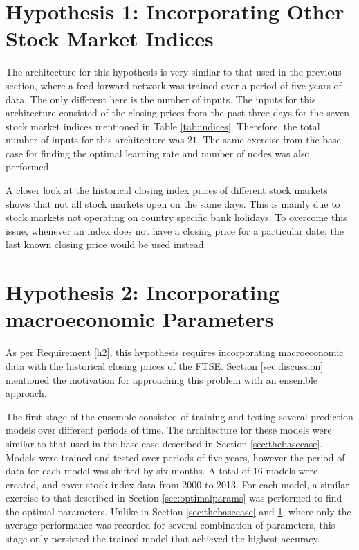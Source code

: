 \documentclass{UoYCSproject}
\begin{document}
\section{Hypothesis 1: Incorporating Other Stock Market Indices}
\label{sec:methodh1}
The architecture for this hypothesis is very similar to that used in the previous section, where a feed forward network was trained over a period of five years of data. The only different here is the number of inputs. The inputs for this architecture consisted of the closing prices from the past three days for the seven stock market indices mentioned in Table \ref{tab:indices}. Therefore, the total number of inputs for this architecture was $21$. The same exercise from the base case for finding the optimal learning rate and number of nodes was also performed. 

A closer look at the historical closing index prices of different stock markets shows that not all stock markets open on the same days. This is mainly due to stock markets not operating on country specific bank holidays. To overcome this issue, whenever an index does not have a closing price for a particular date, the last known closing price would be used instead.  

\section{Hypothesis 2: Incorporating macroeconomic Parameters}
\label{sec:methodh2}
As per Requirement \ref{h2}, this hypothesis requires incorporating macroeconomic data with the historical closing prices of the FTSE. Section \ref{sec:discussion} mentioned the motivation for approaching this problem with an ensemble approach. 

The first stage of the ensemble consisted of training and testing several prediction models over different periods of time. The architecture for these models were similar to that used in the base case described in Section \ref{sec:thebasecase}. Models were trained and tested over periods of five years, however the period of data for each model was shifted by six months. A total of $16$ models were created, and cover stock index data from 2000 to 2013. For each model, a similar exercise to that described in Section \ref{sec:optimalparams} was performed to find the optimal parameters. Unlike in Section \ref{sec:thebasecase} and \ref{sec:methodh1}, where only the average performance was recorded for several combination of parameters, this stage only persisted the trained model that achieved the highest accuracy.  
\end{document}
